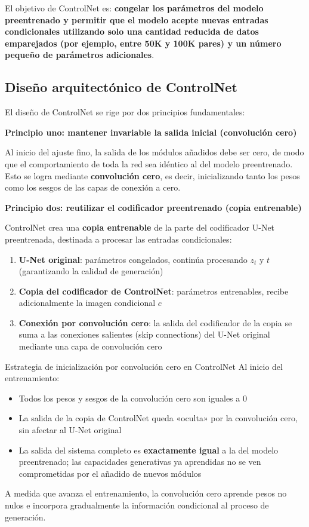 \documentclass[a4paper]{article}
\begin{document}
El objetivo de ControlNet es: \textbf{congelar los parámetros del modelo preentrenado y permitir que el modelo acepte nuevas entradas condicionales utilizando solo una cantidad reducida de datos emparejados (por ejemplo, entre 50K y 100K pares) y un número pequeño de parámetros adicionales}.

\subsection{Diseño arquitectónico de ControlNet}

El diseño de ControlNet se rige por dos principios fundamentales:

\textbf{Principio uno: mantener invariable la salida inicial (convolución cero)}

Al inicio del ajuste fino, la salida de los módulos añadidos debe ser cero, de modo que el comportamiento de toda la red sea idéntico al del modelo preentrenado. Esto se logra mediante \textbf{convolución cero}, es decir, inicializando tanto los pesos como los sesgos de las capas de conexión a cero.

\textbf{Principio dos: reutilizar el codificador preentrenado (copia entrenable)}

ControlNet crea una \textbf{copia entrenable} de la parte del codificador U-Net preentrenada, destinada a procesar las entradas condicionales:

\begin{enumerate}
    \item \textbf{U-Net original}: parámetros congelados, continúa procesando $z_t$ y $t$ (garantizando la calidad de generación)
    \item \textbf{Copia del codificador de ControlNet}: parámetros entrenables, recibe adicionalmente la imagen condicional $c$
    \item \textbf{Conexión por convolución cero}: la salida del codificador de la copia se suma a las conexiones salientes (skip connections) del U-Net original mediante una capa de convolución cero
\end{enumerate}

\begin{importantbox}{Estrategia de inicialización por convolución cero en ControlNet}
Al inicio del entrenamiento:
\begin{itemize}
    \item Todos los pesos y sesgos de la convolución cero son iguales a 0
    \item La salida de la copia de ControlNet queda «oculta» por la convolución cero, sin afectar al U-Net original
    \item La salida del sistema completo es \textbf{exactamente igual} a la del modelo preentrenado; las capacidades generativas ya aprendidas no se ven comprometidas por el añadido de nuevos módulos
\end{itemize}
A medida que avanza el entrenamiento, la convolución cero aprende pesos no nulos e incorpora gradualmente la información condicional al proceso de generación.
\end{importantbox}
\end{document}
